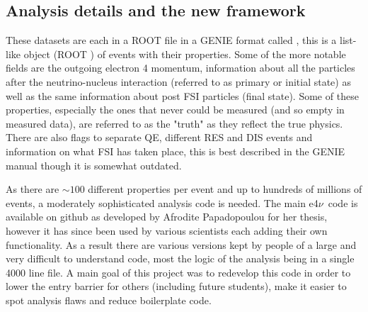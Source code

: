 \documentclass[a4paper,12pt]{article}
\newcommand{\efn}{e4$\nu$}
\newcommand{\verbb}[1]{\text{\Verb|#1|}}
\begin{document}
\subsection{Analysis details and the new framework}\label{sec:code}
These datasets are each in a ROOT file in a GENIE format called \verbb{gst}, this is a list-like object (ROOT \verbb{TTree}) of events with their properties.
Some of the more notable fields are the outgoing electron 4 momentum, information about all the particles after the neutrino-nucleus interaction (referred to as primary or initial state) as well as the same information about post FSI particles (final state).
Some of these properties, especially the ones that never could be measured (and so empty in measured data), are referred to as the "truth" as they reflect the true physics.
There are also flags to separate QE, different RES and DIS events and information on what FSI has taken place, this is best described in the GENIE manual\cite{andreopoulosGENIENeutrinoMonte2015} though it is somewhat outdated.

As there are $\sim100$ different properties per event and up to hundreds of millions of events, a moderately sophisticated analysis code is needed.
The main \efn\ code is available on github \cite{E4nuE4nuanalysiscodePlaceholder} as developed by Afrodite Papadopoulou for her thesis\cite{papadopoulouLeptonNucleusScatteringMeasurements2023}, however it has since been used by various scientists each adding their own functionality.
As a result there are various versions kept by people of a large and very difficult to understand code, most the logic of the analysis being in a single 4000 line file.
A main goal of this project was to redevelop this code in order to lower the entry barrier for others (including future students), make it easier to spot analysis flaws and reduce boilerplate code.
\end{document}
